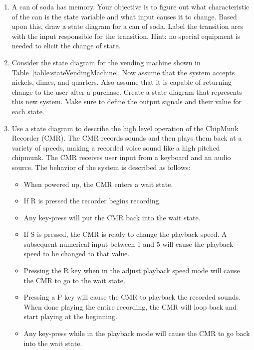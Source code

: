 \begin{enumerate}
  \item
    A can of soda has memory. Your objective is to figure out what
    characteristic of the can is the state variable and what input
    causes it to change. Based upon this, draw a state diagram for a can
    of soda. Label the transition arcs with the input responsible for
    the transition. Hint: no special equipment is needed to elicit the
    change of state.
  \item
    Consider the state diagram for the vending machine shown in 
    Table~\ref{table:stateVendingMachine}.
    Now assume that the system accepts nickels, dimes, and
    quarters. Also assume that it is capable of returning change to the
    user after a purchase. Create a state diagram that represents this
    new system. Make sure to define the output signals and their value
    for each state.
  \item
    Use a state diagram to describe the high level operation of the
    ChipMunk Recorder (CMR). The CMR records sounds and then plays them
    back at a variety of speeds, making a recorded voice sound like a
    high pitched chipmunk. The CMR receives user input from a keyboard
    and an audio source. The behavior of the system is described as
    follows:

\begin{itemize}
\item
  When powered up, the CMR enters a wait state.
\item
  If \textquotesingle R\textquotesingle{} is pressed the recorder begins
  recording.
\item
  Any key-press will put the CMR back into the wait state.
\item
  If \textquotesingle S\textquotesingle{} is pressed, the CMR is ready
  to change the playback speed. A subsequent numerical input between 1
  and 5 will cause the playback speed to be changed to that value.
\item
  Pressing the \textquotesingle R\textquotesingle{} key when in the
  adjust playback speed mode will cause the CMR to go to the wait state.
\item
  Pressing a \textquotesingle P\textquotesingle{} key will cause the CMR
  to playback the recorded sounds. When done playing the entire
  recording, the CMR will loop back and start playing at the beginning.
\item
  Any key-press while in the playback mode will cause the CMR to go back
  into the wait state.
\end{itemize}


\end{enumerate}
